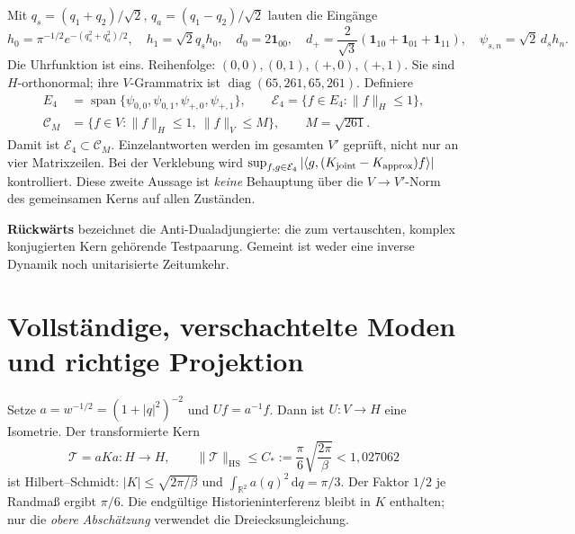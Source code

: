 \documentclass[10pt,a4paper]{article}
\newcommand{\dd}{\,\mathrm d}\newcommand{\ii}{\mathrm i}\newcommand{\R}{\mathbb R}
\newcommand{\one}{\mathbf1}\newcommand{\norm}[1]{\lVert#1\rVert}
\newcommand{\TT}{\mathcal T}\newcommand{\EE}{\mathbb E}\newcommand{\HS}{\mathrm{HS}}
\begin{document}
Mit $q_s=(q_1+q_2)/\sqrt2$, $q_a=(q_1-q_2)/\sqrt2$ lauten die Eingänge
\[
 h_0=\pi^{-1/2}e^{-(q_s^2+q_a^2)/2},\quad h_1=\sqrt2q_s h_0,
 \quad d_0=2\one_{00},\quad
 d_+=\frac2{\sqrt3}(\one_{10}+\one_{01}+\one_{11}),\quad
 \psi_{s,n}=\sqrt2\,d_s h_n.                              \tag{3}
\]
Die Uhrfunktion ist eins. Reihenfolge: $(0,0),(0,1),(+,0),(+,1)$.
Sie sind $H$-orthonormal; ihre $V$-Grammatrix ist
$\operatorname{diag}(65,261,65,261)$. Definiere
\[
 \begin{aligned}
 E_4&=\operatorname{span}\{\psi_{0,0},\psi_{0,1},\psi_{+,0},\psi_{+,1}\},\qquad
 \mathcal E_4=\{f\in E_4:\norm f_H\le1\},\\
 \mathcal C_M&=\{f\in V:\norm f_H\le1,\ \norm f_V\le M\},\qquad M=\sqrt{261}.
 \end{aligned}
                                                                  \tag{4}
\]
Damit ist $\mathcal E_4\subset\mathcal C_M$. Einzelantworten werden im gesamten
$V'$ geprüft, nicht nur an vier Matrixzeilen. Bei der Verklebung wird
$\sup_{f,g\in\mathcal E_4}|\langle g,(K_{\rm joint}-K_{\rm approx})f\rangle|$
kontrolliert. Diese zweite Aussage ist \emph{keine} Behauptung über die
$V\to V'$-Norm des gemeinsamen Kerns auf allen Zuständen.

\textbf{Rückwärts} bezeichnet die Anti-Dualadjungierte: die zum vertauschten,
komplex konjugierten Kern gehörende Testpaarung. Gemeint ist weder eine
inverse Dynamik noch unitarisierte Zeitumkehr.
\newpage

\section{Vollständige, verschachtelte Moden und richtige Projektion}
Setze $a=w^{-1/2}=(1+|q|^2)^{-2}$ und $Uf=a^{-1}f$. Dann ist $U:V\to H$
eine Isometrie. Der transformierte Kern
\[
 \TT=aKa:H\to H,\qquad
 \norm\TT_{\HS}\le C_*:=\frac\pi6\sqrt{\frac{2\pi}{\beta}}
 <1{,}027062                                                     \tag{5}
\]
ist Hilbert--Schmidt: $|K|\le\sqrt{2\pi/\beta}$ und
$\int_{\R^2}a(q)^2\dd q=\pi/3$. Der Faktor $1/2$ je Randmaß ergibt $\pi/6$.
Die endgültige Historieninterferenz bleibt in $K$ enthalten; nur die
\emph{obere Abschätzung} verwendet die Dreiecksungleichung.
\end{document}
